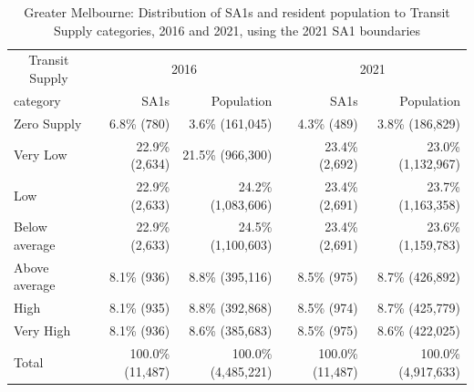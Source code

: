 \documentclass[preprint, 3p,
authoryear]{elsarticle} %
\begin{document}
\begin{table}

\caption{\label{tab:Greater_Melbourne_SA1_2016_2021_table_and_bar_chart}Greater Melbourne: Distribution of SA1s and resident population to Transit Supply categories, 2016 and 2021, using the 2021 SA1 boundaries}
\centering
\begin{tabular}[t]{l|r|r|r|r}
\hline
\multicolumn{1}{c|}{Transit Supply} & \multicolumn{2}{c|}{2016} & \multicolumn{2}{c}{2021} \\
\cline{1-1} \cline{2-3} \cline{4-5}
category & SA1s & Population & SA1s & Population\\
\hline
Zero Supply & 6.8\%    (780) & 3.6\%   (161,045) & 4.3\%    (489) & 3.8\%   (186,829)\\
\hline
Very Low & 22.9\%  (2,634) & 21.5\%   (966,300) & 23.4\%  (2,692) & 23.0\% (1,132,967)\\
\hline
Low & 22.9\%  (2,633) & 24.2\% (1,083,606) & 23.4\%  (2,691) & 23.7\% (1,163,358)\\
\hline
Below average & 22.9\%  (2,633) & 24.5\% (1,100,603) & 23.4\%  (2,691) & 23.6\% (1,159,783)\\
\hline
Above average & 8.1\%    (936) & 8.8\%   (395,116) & 8.5\%    (975) & 8.7\%   (426,892)\\
\hline
High & 8.1\%    (935) & 8.8\%   (392,868) & 8.5\%    (974) & 8.7\%   (425,779)\\
\hline
Very High & 8.1\%    (936) & 8.6\%   (385,683) & 8.5\%    (975) & 8.6\%   (422,025)\\
\hline
Total & 100.0\% (11,487) & 100.0\% (4,485,221) & 100.0\% (11,487) & 100.0\% (4,917,633)\\
\hline
\end{tabular}
\end{table}
\end{document}
